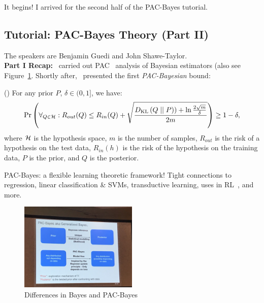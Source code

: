  It begins! I arrived for the second half of the PAC-Bayes tutorial. 

\subsection{Tutorial: PAC-Bayes Theory (Part II)}

The speakers are Benjamin Guedi and John Shawe-Taylor. \\

{\bf Part I Recap:}~\citet{shawe1997pac} carried out PAC~\cite{valiant1984theory} analysis of Bayesian estimators (also see Figure~\ref{fig:pac_bayes}. Shortly after,~\citet{mcallester1999some} presented the first {\it PAC-Bayesian} bound:



\begin{theorem}
\label{thm:pac_bayes}
(\citet{mcallester1999some}) For any prior $P$, $\delta \in (0,1]$, we have:
\begin{equation}
    \Pr\left(\forall_{Q \in \mathcal{H}} : R_{out}(Q) \leq R_{in}(Q) + \sqrt{\frac{D_{\text{KL}}\left(Q \mid \mid P\right)) + \ln \frac{2 \sqrt{m}}{\delta}}{2m}}\right) \geq 1-\delta,
    \label{eq:pac_bayes}
\end{equation}
where $\mathcal{H}$ is the hypothesis space, $m$ is the number of samples, $R_{out}$ is the risk of a hypothesis on the test data, $R_{in}(h)$ is the risk of the hypothesis on the training data, $P$ is the prior, and $Q$ is the posterior.
\end{theorem}


PAC-Bayes: a flexible learning theoretic framework! Tight connections to regression, linear classification \& SVMs, transductive learning, uses in RL~\cite{fard2010pac}, and more.


\begin{figure}[h!]
    \centering
    \includegraphics[width=0.5\textwidth]{images/pb1.JPG}
    \caption{Differences in Bayes and PAC-Bayes}
    \label{fig:pac_bayes}
\end{figure}



